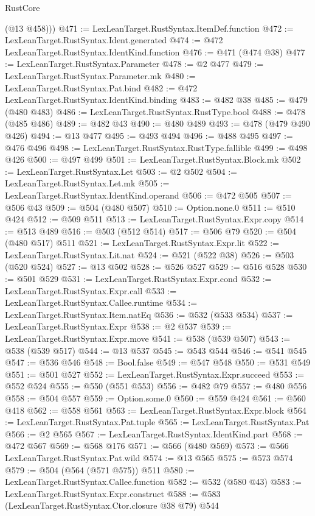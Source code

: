 \begin{lexlean}{RustCore}
\begin{coremodule}
        (@13 @458)))
@471 := LexLeanTarget.RustSyntax.ItemDef.function
@472 := LexLeanTarget.RustSyntax.Ident.generated
@474 := @472 LexLeanTarget.RustSyntax.IdentKind.function
@476 := @471 (@474 @38)
@477 := LexLeanTarget.RustSyntax.Parameter
@478 := @2 @477
@479 := LexLeanTarget.RustSyntax.Parameter.mk
@480 := LexLeanTarget.RustSyntax.Pat.bind
@482 := @472 LexLeanTarget.RustSyntax.IdentKind.binding
@483 := @482 @38
@485 := @479 (@480 @483)
@486 := LexLeanTarget.RustSyntax.RustType.bool
@488 := @478 (@485 @486)
@489 := @482 @43
@490 := @480 @489
@493 := @478 (@479 @490 @426)
@494 := @13 @477
@495 := @493 @494
@496 := @488 @495
@497 := @476 @496
@498 := LexLeanTarget.RustSyntax.RustType.fallible
@499 := @498 @426
@500 := @497 @499
@501 := LexLeanTarget.RustSyntax.Block.mk
@502 := LexLeanTarget.RustSyntax.Let
@503 := @2 @502
@504 := LexLeanTarget.RustSyntax.Let.mk
@505 := LexLeanTarget.RustSyntax.IdentKind.operand
@506 := @472 @505
@507 := @506 @43
@509 := @504 (@480 @507)
@510 := Option.none.{0}
@511 := @510 @424
@512 := @509 @511
@513 := LexLeanTarget.RustSyntax.Expr.copy
@514 := @513 @489
@516 := @503 (@512 @514)
@517 := @506 @79
@520 := @504 (@480 @517) @511
@521 := LexLeanTarget.RustSyntax.Expr.lit
@522 := LexLeanTarget.RustSyntax.Lit.nat
@524 := @521 (@522 @38)
@526 := @503 (@520 @524)
@527 := @13 @502
@528 := @526 @527
@529 := @516 @528
@530 := @501 @529
@531 := LexLeanTarget.RustSyntax.Expr.cond
@532 := LexLeanTarget.RustSyntax.Expr.call
@533 := LexLeanTarget.RustSyntax.Callee.runtime
@534 := LexLeanTarget.RustSyntax.Item.natEq
@536 := @532 (@533 @534)
@537 := LexLeanTarget.RustSyntax.Expr
@538 := @2 @537
@539 := LexLeanTarget.RustSyntax.Expr.move
@541 := @538 (@539 @507)
@543 := @538 (@539 @517)
@544 := @13 @537
@545 := @543 @544
@546 := @541 @545
@547 := @536 @546
@548 := Bool.false
@549 := @547 @548
@550 := @531 @549
@551 := @501 @527
@552 := LexLeanTarget.RustSyntax.Expr.succeed
@553 := @552 @524
@555 := @550 (@551 @553)
@556 := @482 @79
@557 := @480 @556
@558 := @504 @557
@559 := Option.some.{0}
@560 := @559 @424
@561 := @560 @418
@562 := @558 @561
@563 := LexLeanTarget.RustSyntax.Expr.block
@564 := LexLeanTarget.RustSyntax.Pat.tuple
@565 := LexLeanTarget.RustSyntax.Pat
@566 := @2 @565
@567 := LexLeanTarget.RustSyntax.IdentKind.part
@568 := @472 @567
@569 := @568 @176
@571 := @566 (@480 @569)
@573 := @566 LexLeanTarget.RustSyntax.Pat.wild
@574 := @13 @565
@575 := @573 @574
@579 := @504 (@564 (@571 @575)) @511
@580 := LexLeanTarget.RustSyntax.Callee.function
@582 := @532 (@580 @43)
@583 := LexLeanTarget.RustSyntax.Expr.construct
@588 := @583 (LexLeanTarget.RustSyntax.Ctor.closure @38 @79) @544

\end{coremodule}
\end{lexlean}
